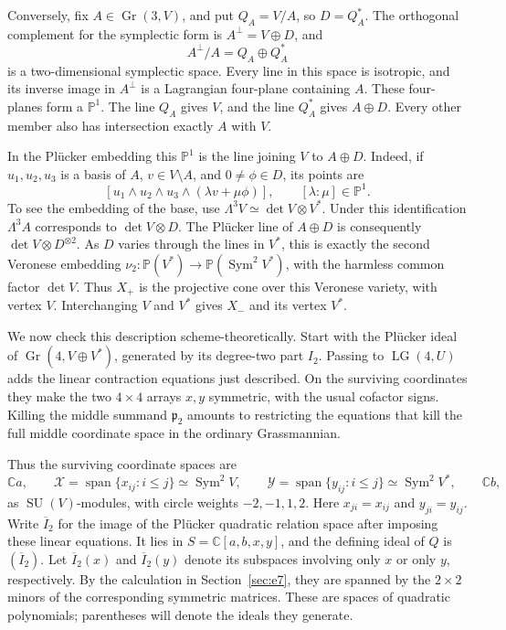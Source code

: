 \documentclass[11pt]{article}
\newcommand{\C}{\mathbb C}
\newcommand{\PP}{\mathbb P}
\newcommand{\Gr}{\operatorname{Gr}}
\newcommand{\LG}{\operatorname{LG}}
\newcommand{\Sym}{\operatorname{Sym}}
\newcommand{\SU}{\operatorname{SU}}
\newcommand{\fp}{\mathfrak p}
\theoremstyle{definition}
\numberwithin{equation}{section}
\begin{document}
Conversely, fix $A\in\Gr(3,V)$, and put $Q_A=V/A$, so
$D=Q_A^*$. The orthogonal complement for the symplectic form is
$A^\perp=V\oplus D$, and
\[
 A^\perp/A=Q_A\oplus Q_A^*
\]
is a two-dimensional symplectic space. Every line in this space is
isotropic, and its inverse image in $A^\perp$ is a Lagrangian
four-plane containing $A$. These four-planes form a $\PP^1$.
The line $Q_A$ gives $V$, and the line $Q_A^*$ gives $A\oplus D$.
Every other member also has intersection exactly $A$ with $V$.

In the Pl\"ucker embedding this $\PP^1$ is the line joining
$V$ to $A\oplus D$. Indeed, if $u_1,u_2,u_3$ is a basis of $A$,
$v\in V\setminus A$, and $0\ne\phi\in D$, its points are
\[
 [u_1\wedge u_2\wedge u_3\wedge(\lambda v+\mu\phi)],
 \qquad[\lambda:\mu]\in\PP^1.
\]
To see the embedding of the base, use
$\Lambda^3V\simeq\det V\otimes V^*$. Under this identification
$\Lambda^3A$ corresponds to $\det V\otimes D$. The Pl\"ucker
line of $A\oplus D$ is consequently
$\det V\otimes D^{\otimes2}$. As $D$ varies through the lines
in $V^*$, this is exactly the second Veronese embedding
$\nu_2:\PP(V^*)\to\PP(\Sym^2V^*)$, with the harmless common
factor $\det V$. Thus $X_+$ is the projective cone over this
Veronese variety, with vertex $V$. Interchanging $V$ and $V^*$
gives $X_-$ and its vertex $V^*$.

We now check this description scheme-theoretically. Start with the
Pl\"ucker ideal of $\Gr(4,V\oplus V^*)$, generated by its degree-two
part $I_2$. Passing to $\LG(4,U)$ adds the linear contraction equations
just described. On the surviving coordinates they make the two
$4\times4$ arrays $x,y$ symmetric, with the usual cofactor signs.
Killing the middle summand $\fp_2$ amounts to restricting the equations
that kill the full middle coordinate space in the ordinary Grassmannian.

Thus the surviving coordinate spaces are
\[
 \C a,\qquad \mathcal X=\operatorname{span}\{x_{ij}:i\leq j\}
       \simeq\Sym^2V,\qquad
 \mathcal Y=\operatorname{span}\{y_{ij}:i\leq j\}
       \simeq\Sym^2V^*,\qquad \C b,
\]
as $\SU(V)$-modules, with circle weights $-2,-1,1,2$.
Here $x_{ji}=x_{ij}$ and $y_{ji}=y_{ij}$.
Write $\overline I_2$ for the image of the Pl\"ucker quadratic
relation space after imposing these linear equations. It lies in
$S=\C[a,b,x,y]$, and the defining ideal of $Q$ is $(\overline I_2)$.
Let $\overline I_2(x)$ and $\overline I_2(y)$ denote its subspaces
involving only $x$ or only $y$, respectively. By the calculation in
Section~\ref{sec:e7}, they are spanned by the $2\times2$ minors of
the corresponding symmetric matrices. These are spaces of quadratic
polynomials; parentheses will denote the ideals they generate.
\end{document}
